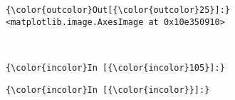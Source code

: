 \documentclass{article}
\begin{document}
            \begin{Verbatim}[commandchars=\\\{\}]
{\color{outcolor}Out[{\color{outcolor}25}]:} <matplotlib.image.AxesImage at 0x10e350910>
\end{Verbatim}
        
    \begin{center}
    \end{center}
    { \hspace*{\fill} \\}
    
    \begin{Verbatim}[commandchars=\\\{\}]
{\color{incolor}In [{\color{incolor}105}]:} 
\end{Verbatim}

    \begin{Verbatim}[commandchars=\\\{\}]
{\color{incolor}In [{\color{incolor}}]:} 
\end{Verbatim}


    
    
    
    
\end{document}

